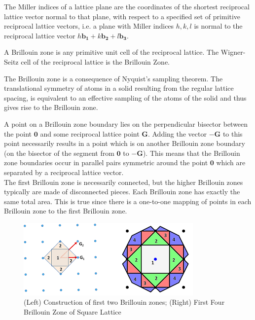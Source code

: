 \documentclass[a4paper]{article}
\begin{document}
\begin{cor}
The Miller indices of a lattice plane are the coordinates of the shortest reciprocal lattice vector normal to that plane, with respect to a specified set of primitive reciprocal lattice vectors, i.e. a plane with Miller indices $h,k,l$ is normal to the reciprocal lattice vector $h\mathbf{b_1}+k\mathbf{b_2}+l\mathbf{b_3}$.
\end{cor}
\begin{defi}
A Brillouin zone is any primitive unit cell of the reciprocal lattice. The Wigner-Seitz cell of the reciprocal lattice is the Brillouin Zone.
\end{defi}
\begin{remarks}
The Brillouin zone is a consequence  of Nyquist's sampling theorem. The translational symmetry of atoms in a solid resulting from the regular lattice spacing, is equivalent to an effective sampling of the atoms of the solid and thus gives rise to the Brillouin zone.
\end{remarks}
\begin{eg}
A point on a Brillouin zone boundary lies on the perpendicular bisector between the point $\boldsymbol{0}$ and some reciprocal lattice point $\mathbf{G}$. Adding the vector $-\mathbf{G}$ to this point necessarily results in a point which is on another Brillouin zone boundary (on the bisector of the segment from $\boldsymbol{0}$ to $-\mathbf{G}$). This means that the Brillouin zone boundaries occur in parallel pairs symmetric around the point $\boldsymbol{0}$ which are separated by a reciprocal lattice vector.\\[5pt]
The first Brillouin zone is necessarily connected, but the higher Brillouin zones typically are made of disconnected pieces. Each Brillouin zone has exactly the same total area. This is true since there is a one-to-one mapping of points in each Brillouin zone to the first Brillouin zone.
\end{eg}
\begin{figure}[H]
    \centering
    \includegraphics[width=\linewidth]{BZsquare.png}
    \caption{(Left) Construction of first two Brillouin zones; (Right) First Four Brillouin Zone of Square Lattice}
\end{figure}
\end{document}

